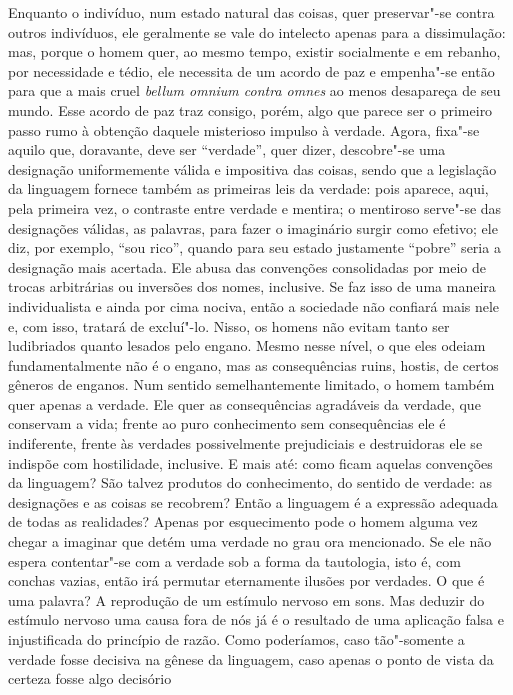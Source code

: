 Enquanto o indivíduo, num estado natural das coisas, quer preservar"-se
contra outros indivíduos, ele geralmente se vale do intelecto apenas
para a dissimulação: mas, porque o homem quer, ao mesmo tempo, existir
socialmente e em rebanho, por necessidade e tédio, ele necessita de um
acordo de paz e empenha"-se então para que a mais cruel \textit{bellum
omnium contra omnes} ao menos desapareça de seu mundo. Esse acordo de
paz traz consigo, porém, algo que parece ser o primeiro passo rumo à
obtenção daquele misterioso impulso à verdade. Agora, fixa"-se aquilo
que, doravante, deve ser “verdade”, quer dizer, descobre"-se uma
designação uniformemente válida e impositiva das coisas, sendo que a
legislação da linguagem fornece também as primeiras leis da verdade:
pois aparece, aqui, pela primeira vez, o contraste entre verdade e
mentira; o mentiroso serve"-se das designações válidas, as palavras,
para fazer o imaginário surgir como efetivo; ele diz, por exemplo,
“sou rico”, quando para seu estado justamente “pobre” seria a
designação mais acertada. Ele abusa das convenções consolidadas por
meio de trocas arbitrárias ou inversões dos nomes, inclusive. Se 
faz isso de uma maneira individualista e ainda por cima nociva,
então a sociedade não confiará mais nele e, com isso, tratará de
excluí"-lo. Nisso, os homens não evitam tanto ser ludibriados
quanto lesados pelo engano. Mesmo nesse nível, o que eles odeiam
fundamentalmente não é o engano, mas as consequências ruins, hostis, de
certos gêneros de enganos. Num sentido semelhantemente limitado, o homem
também quer apenas a verdade. Ele quer as consequências agradáveis da
verdade, que conservam a vida; frente ao puro conhecimento sem
consequências ele é indiferente, frente às verdades possivelmente
prejudiciais e destruidoras ele se indispõe com hostilidade, inclusive.
E mais até: como ficam aquelas convenções da linguagem? São talvez
produtos do conhecimento, do sentido de verdade: as designações e as
coisas se recobrem? Então a linguagem é a expressão adequada de todas
as realidades?
Apenas por esquecimento pode o homem alguma vez chegar a imaginar que
detém uma verdade no grau ora mencionado. Se ele não espera
contentar"-se com a verdade sob a forma da tautologia, isto é, com
conchas vazias, então irá permutar eternamente ilusões por verdades. O
que é uma palavra? A reprodução de um estímulo nervoso em sons. Mas
deduzir do estímulo nervoso uma causa fora de nós já é o resultado de
uma aplicação falsa e injustificada do princípio de razão. Como
poderíamos, caso tão"-somente a verdade fosse decisiva na gênese da
linguagem, caso apenas o ponto de vista da certeza fosse algo decisório
